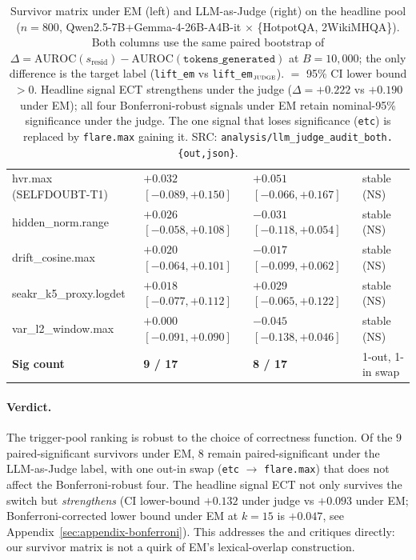 \documentclass[11pt]{article}
\begin{document}
\begin{table}[h]
\begin{tabular}{@{}llll@{}}
hvr.max (SELFDOUBT-T1)    & $+0.032$ $[-0.089, +0.150]$ & $+0.051$ $[-0.066, +0.167]$ & stable (NS) \\
hidden\_norm.range        & $+0.026$ $[-0.058, +0.108]$ & $-0.031$ $[-0.118, +0.054]$ & stable (NS) \\
drift\_cosine.max         & $+0.020$ $[-0.064, +0.101]$ & $-0.017$ $[-0.099, +0.062]$ & stable (NS) \\
seakr\_k5\_proxy.logdet   & $+0.018$ $[-0.077, +0.112]$ & $+0.029$ $[-0.065, +0.122]$ & stable (NS) \\
var\_l2\_window.max       & $+0.000$ $[-0.091, +0.090]$ & $-0.045$ $[-0.138, +0.046]$ & stable (NS) \\
\midrule
\textbf{Sig count} & \textbf{9 / 17} & \textbf{8 / 17} & 1-out, 1-in swap \\
\bottomrule
\end{tabular}
\caption{Survivor matrix under EM (left) and LLM-as-Judge (right) on the
headline pool ($n{=}800$, Qwen2.5-7B+Gemma-4-26B-A4B-it $\times$
\{HotpotQA, 2WikiMHQA\}). Both columns use the same paired bootstrap of
$\Delta = \mathrm{AUROC}(s_{\mathrm{resid}}) -
\mathrm{AUROC}(\texttt{tokens\_generated})$ at $B{=}10{,}000$; the only
difference is the target label
(\texttt{lift\_em} vs \texttt{lift\_em}$_{\textsc{judge}}$).
\checkmark $=$ 95\% CI lower bound $> 0$. Headline signal ECT
strengthens under the judge ($\Delta{=}+0.222$ vs $+0.190$ under EM); all
four Bonferroni-robust signals under EM retain nominal-95\% significance
under the judge. The one signal that loses significance (\texttt{etc})
is replaced by \texttt{flare.max} gaining it. SRC:
\texttt{analysis/llm\_judge\_audit\_both.\{out,json\}}.}
\label{tab:llmjudge}
\end{table}

\paragraph{Verdict.} The trigger-pool ranking is robust to the choice of
correctness function. Of the $9$ paired-significant survivors under EM,
$8$ remain paired-significant under the LLM-as-Judge label, with one
out-in swap (\texttt{etc} $\to$ \texttt{flare.max}) that does not affect
the Bonferroni-robust four. The headline signal ECT not only survives the
switch but \emph{strengthens} (CI lower-bound $+0.132$ under judge vs
$+0.093$ under EM; Bonferroni-corrected lower bound under EM at $k{=}15$
is $+0.047$, see Appendix~\ref{sec:appendix-bonferroni}).
This addresses the
\citet{Janiak_IllusionProgressHallucinationDetection} and
\citet{Ielanskyi_PitfallsUQEvaluationNLG} critiques directly: our
survivor matrix is not a quirk of EM's lexical-overlap construction.
\end{document}

